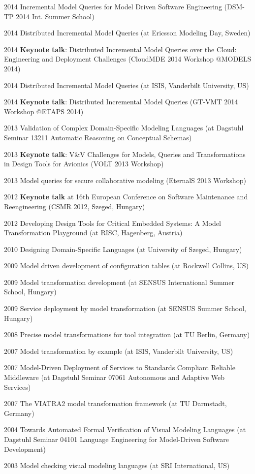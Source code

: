\begin{yearlist}
\item[2014] Incremental Model Queries for Model Driven Software Engineering (DSM-TP 2014 Int. Summer School)
\item[2014] Distributed Incremental Model Queries (at Ericsson Modeling Day, Sweden)
\item[2014] \textbf{Keynote talk}: Distributed Incremental  Model Queries over the Cloud: Engineering and Deployment Challenges (CloudMDE 2014 Workshop @MODELS 2014)
\item[2014] Distributed Incremental Model Queries (at ISIS, Vanderbilt University, US)
\item[2014] \textbf{Keynote talk}: Distributed Incremental Model Queries (GT-VMT 2014 Workshop @ETAPS 2014) 
\item[2013] Validation of Complex Domain-Specific Modeling Languages (at Dagstuhl Seminar 13211 Automatic Reasoning on Conceptual Schemas)
\item[2013] \textbf{Keynote talk}: V\&V Challenges for Models, Queries and Transformations in Design Tools for Avionics (VOLT 2013 Workshop)
\item[2013] Model queries for secure collaborative modeling (EternalS 2013 Workshop) 
\item[2012] \textbf{Keynote talk} at 16th European Conference on Software Maintenance and Reengineering (CSMR 2012, Szeged, Hungary) 
\item[2012] Developing Design Tools for Critical Embedded Systems: A Model Transformation Playground
(at RISC, Hagenberg, Austria) 
\item[2010] Designing Domain-Specific Languages (at University of Szeged, Hungary)
\item[2009] Model driven development of configuration tables (at Rockwell Collins, US)
\item[2009] Model transformation development (at SENSUS International Summer School, Hungary)
\item[2009] Service deployment by model transformation (at SENSUS Summer School, Hungary)
\item[2008] Precise model transformations for tool integration (at TU Berlin, Germany)
\item[2007] Model transformation by example (at ISIS, Vanderbilt University, US)
\item[2007] Model-Driven Deployment of Services to Standards Compliant Reliable Middleware (at Dagstuhl Seminar 07061 Autonomous and Adaptive Web Services)
\item[2007] The VIATRA2 model transformation framework (at TU Darmstadt, Germany)
\item[2004] Towards Automated Formal Verification of Visual Modeling Languages
(at Dagstuhl Seminar 04101 Language Engineering for Model-Driven Software Development) 
\item[2003] Model checking visual modeling languages (at SRI International, US) 
\end{yearlist}

